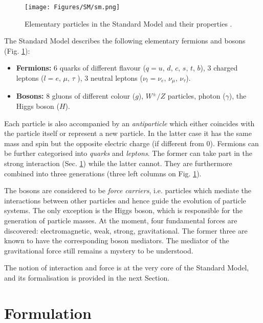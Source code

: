 \begin{figure}[h!]
    \centering
    \texttt{[image: Figures/SM/sm.png]}
    \caption{Elementary particles in the Standard Model and their properties \cite{SM:web-plot}.}
    \label{fig:sm}
\end{figure}

The Standard Model describes the following elementary fermions and bosons (Fig. \ref{fig:sm}):
\begin{itemize}
    \item \textbf{Fermions:} 6 quarks of different flavour ($q = u, \,d, \,c, \,s, \,t, \,b$), 3 charged leptons ($l = e, \,\mu, \,\tau$ ), 3 neutral leptons ($\nu_l= \nu_e, \,\nu_\mu, \,\nu_\tau$).
    \item \textbf{Bosons:} 8 gluons of different colour ($g$), $W^\pm/Z$ particles, photon ($\gamma$), the Higgs boson ($H$). 
\end{itemize}

Each particle is also accompanied by an \textit{antiparticle} which either coincides with the particle itself or represent a new particle. In the latter case it has the same mass and spin but the opposite electric charge (if different from 0). Fermions can be further categorised into \textit{quarks} and \textit{leptons}. The former can take part in the strong interaction (Sec. \ref{sec:lagr}) while the latter cannot. They are furthermore combined into three generations (three left columns on Fig. \ref{fig:sm}).

The bosons are considered to be \textit{force carriers}, i.e. particles which mediate the interactions between other particles and hence guide the evolution of particle systems. The only exception is the Higgs boson, which is responsible for the generation of particle masses. At the moment, four fundamental forces are discovered: electromagnetic, weak, strong, gravitational. The former three are known to have the corresponding boson mediators. The mediator of the gravitational force still remains a mystery to be understood. 

The notion of interaction and force is at the very core of the Standard Model, and its formalisation is provided in the next Section. 

\section{Formulation}\label{sec:lagr}

